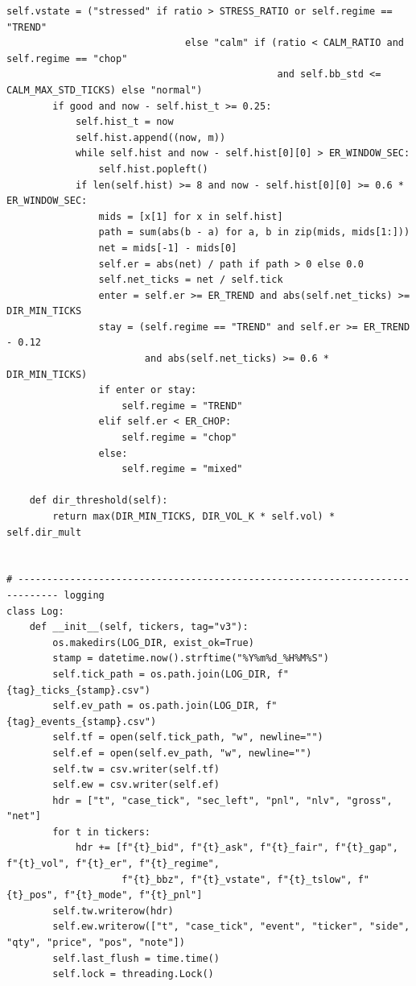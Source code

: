 \begin{lstlisting}[style=algocode]
                self.vstate = ("stressed" if ratio > STRESS_RATIO or self.regime == "TREND"
                               else "calm" if (ratio < CALM_RATIO and self.regime == "chop"
                                               and self.bb_std <= CALM_MAX_STD_TICKS) else "normal")
        if good and now - self.hist_t >= 0.25:
            self.hist_t = now
            self.hist.append((now, m))
            while self.hist and now - self.hist[0][0] > ER_WINDOW_SEC:
                self.hist.popleft()
            if len(self.hist) >= 8 and now - self.hist[0][0] >= 0.6 * ER_WINDOW_SEC:
                mids = [x[1] for x in self.hist]
                path = sum(abs(b - a) for a, b in zip(mids, mids[1:]))
                net = mids[-1] - mids[0]
                self.er = abs(net) / path if path > 0 else 0.0
                self.net_ticks = net / self.tick
                enter = self.er >= ER_TREND and abs(self.net_ticks) >= DIR_MIN_TICKS
                stay = (self.regime == "TREND" and self.er >= ER_TREND - 0.12
                        and abs(self.net_ticks) >= 0.6 * DIR_MIN_TICKS)
                if enter or stay:
                    self.regime = "TREND"
                elif self.er < ER_CHOP:
                    self.regime = "chop"
                else:
                    self.regime = "mixed"

    def dir_threshold(self):
        return max(DIR_MIN_TICKS, DIR_VOL_K * self.vol) * self.dir_mult


# ----------------------------------------------------------------------------- logging
class Log:
    def __init__(self, tickers, tag="v3"):
        os.makedirs(LOG_DIR, exist_ok=True)
        stamp = datetime.now().strftime("%Y%m%d_%H%M%S")
        self.tick_path = os.path.join(LOG_DIR, f"{tag}_ticks_{stamp}.csv")
        self.ev_path = os.path.join(LOG_DIR, f"{tag}_events_{stamp}.csv")
        self.tf = open(self.tick_path, "w", newline="")
        self.ef = open(self.ev_path, "w", newline="")
        self.tw = csv.writer(self.tf)
        self.ew = csv.writer(self.ef)
        hdr = ["t", "case_tick", "sec_left", "pnl", "nlv", "gross", "net"]
        for t in tickers:
            hdr += [f"{t}_bid", f"{t}_ask", f"{t}_fair", f"{t}_gap", f"{t}_vol", f"{t}_er", f"{t}_regime",
                    f"{t}_bbz", f"{t}_vstate", f"{t}_tslow", f"{t}_pos", f"{t}_mode", f"{t}_pnl"]
        self.tw.writerow(hdr)
        self.ew.writerow(["t", "case_tick", "event", "ticker", "side", "qty", "price", "pos", "note"])
        self.last_flush = time.time()
        self.lock = threading.Lock()


\end{lstlisting}
